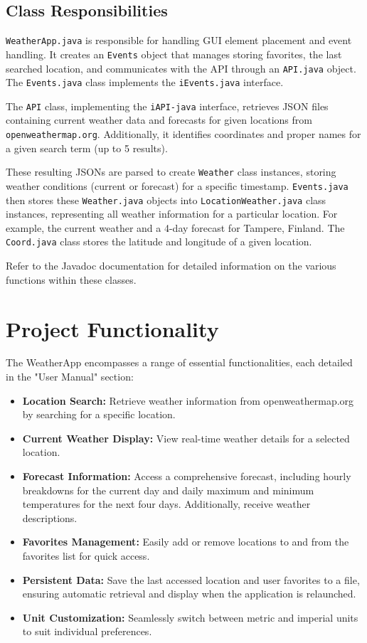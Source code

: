 \documentclass[a4paper,10pt]{article}
\begin{document}
\FloatBarrier

\subsection{Class Responsibilities}


\texttt{WeatherApp.java} is responsible for handling GUI element placement and event handling. It creates an \texttt{Events} object that manages storing favorites, the last searched location, and communicates with the API through an \texttt{API.java} object. The \texttt{Events.java} class implements the \texttt{iEvents.java} interface. 

The \texttt{API} class, implementing the \texttt{iAPI-java} interface, retrieves JSON files containing current weather data and forecasts for given locations from \texttt{openweathermap.org}. Additionally, it identifies coordinates and proper names for a given search term (up to 5 results).

These resulting JSONs are parsed to create \texttt{Weather} class instances, storing weather conditions (current or forecast) for a specific timestamp. \texttt{Events.java} then stores these \texttt{Weather.java} objects into \texttt{LocationWeather.java} class instances, representing all weather information for a particular location. For example, the current weather and a 4-day forecast for Tampere, Finland. The \texttt{Coord.java} class stores the latitude and longitude of a given location.

Refer to the Javadoc documentation for detailed information on the various functions within these classes.


\section{Project Functionality}

The WeatherApp encompasses a range of essential functionalities, each detailed in the "User Manual" section:

\begin{itemize}
	\item \textbf{Location Search:} Retrieve weather information from openweathermap.org by searching for a specific location.
	\item \textbf{Current Weather Display:} View real-time weather details for a selected location.
	\item \textbf{Forecast Information:} Access a comprehensive forecast, including hourly breakdowns for the current day and daily maximum and minimum temperatures for the next four days. Additionally, receive weather descriptions.
	\item \textbf{Favorites Management:} Easily add or remove locations to and from the favorites list for quick access.
	\item \textbf{Persistent Data:} Save the last accessed location and user favorites to a file, ensuring automatic retrieval and display when the application is relaunched.
	\item \textbf{Unit Customization:} Seamlessly switch between metric and imperial units to suit individual preferences.
\end{itemize}
\end{document}
